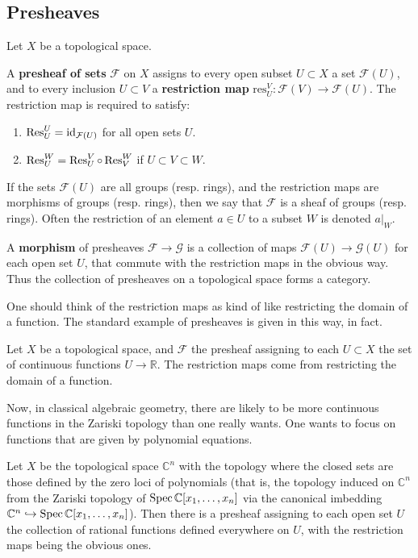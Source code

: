\subsection{Presheaves}
Let $X$ be a topological space. 
\begin{definition} 
A \textbf{presheaf of sets} $\mathcal{F}$ on $X$ assigns to
every open subset
$U \subset X$ a set $\mathcal{F} (U)$, and to every inclusion $U
\subset V$ a
\textbf{restriction map}
$\mathrm{res}^V_U : \mathcal{F}(V) \to \mathcal{F}(U)$. The
restriction map is
required to satisfy:
\begin{enumerate}
\item $\operatorname{Res}^U_U = \operatorname{id}_{\mathcal{F}(U)} $ for all open sets $U$.
\item $\operatorname{Res}^W_U = \operatorname{Res}^V_U \circ \operatorname{Res}^W_V $ if $U \subset V
\subset W$.
\end{enumerate}

If the sets $\mathcal{F}(U)$ are all groups (resp. rings), and
the restriction
maps are morphisms of groups (resp. rings), then we say that
$\mathcal{F}$ is a
sheaf of groups (resp. rings). Often the restriction of an
element $a\in U$ to a subset $W$ is denoted $a|_W$.

A \textbf{morphism} of presheaves $\mathcal{F} \to \mathcal{G}$ is a
collection of maps $\mathcal{F}(U) \to \mathcal{G}(U)$ for each open set $U$,
that commute with the restriction maps in the obvious way. Thus the collection
of presheaves on a topological space forms a category.
\end{definition} 


One should think of the restriction maps as kind of like
restricting the
domain of a function.
The standard example of presheaves is given in this way, in
fact.

\begin{example} 
Let $X$ be a topological space, and $\mathcal{F}$ the presheaf
assigning to
each $U \subset X$ the set of continuous functions $U \to
\mathbb{R}$. The
restriction maps come from restricting the domain of a function.\end{example} 

Now, in classical algebraic geometry, there are likely to be
more
continuous functions in the Zariski topology than one really
wants. One wants
to focus on functions that are given by polynomial equations.

\begin{example} 
Let $X$ be the topological space $\mathbb{C}^n$ with the
topology where the
closed sets are those defined by the zero loci of polynomials
(that is, the
topology induced on $\mathbb{C}^n$ from the Zariski topology of
$\operatorname{Spec}
\mathbb{C}[x_1, \dots, x_n]$ via the canonical imbedding
$\mathbb{C}^n
\hookrightarrow \operatorname{Spec} \mathbb{C}[x_1, \dots, x_n]$). Then there
is a presheaf
assigning to each open set $U$ the collection of rational
functions defined
everywhere on $U$, with the restriction maps being the obvious
ones.
\end{example} 




